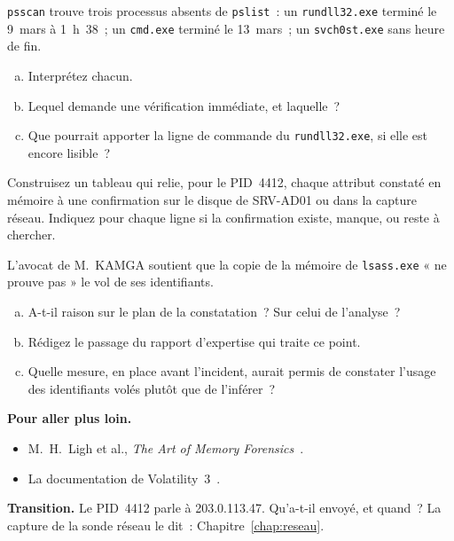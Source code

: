 \begin{boxexo}[title={\ding{45}\quad Exercice~5.2. pslist et psscan \niveaumoyen}]
\texttt{psscan} trouve trois processus absents de \texttt{pslist}~: un
\texttt{rundll32.exe} terminé le 9~mars à 1~h~38~; un \texttt{cmd.exe}
terminé le 13~mars~; un \texttt{svch0st.exe} sans heure de fin.
\begin{enumerate}[(a)]
    \item Interprétez chacun.
    \item Lequel demande une vérification immédiate, et laquelle~?
    \item Que pourrait apporter la ligne de commande du \texttt{rundll32.exe},
          si elle est encore lisible~?
\end{enumerate}
\end{boxexo}

\begin{boxexo}[title={\ding{45}\quad Exercice~5.3. Relier les sources \niveaumoyen}]
Construisez un tableau qui relie, pour le PID~4412, chaque attribut constaté
en mémoire à une confirmation sur le disque de SRV-AD01 ou dans la capture
réseau. Indiquez pour chaque ligne si la confirmation existe, manque, ou
reste à chercher.
\end{boxexo}

\begin{boxexo}[title={\ding{45}\quad Exercice~5.4. Ce qu'on ne peut pas montrer \niveauexpert}]
L'avocat de M.~KAMGA soutient que la copie de la mémoire de
\texttt{lsass.exe} « ne prouve pas » le vol de ses identifiants.
\begin{enumerate}[(a)]
    \item A-t-il raison sur le plan de la constatation~? Sur celui de
          l'analyse~?
    \item Rédigez le passage du rapport d'expertise qui traite ce point.
    \item Quelle mesure, en place avant l'incident, aurait permis de
          constater l'usage des identifiants volés plutôt que de l'inférer~?
\end{enumerate}
\end{boxexo}

\bigskip

\begin{boxinfo}
\textbf{Pour aller plus loin.}
\begin{itemize}
    \item M.~H.~Ligh et al., \textit{The Art of Memory
          Forensics}~\cite{ligh2014memory}.
    \item La documentation de Volatility~3~\cite{volatility3}.
\end{itemize}
\end{boxinfo}

\begin{boxinfo}
\textbf{Transition.} Le PID~4412 parle à 203.0.113.47. Qu'a-t-il envoyé, et
quand~? La capture de la sonde réseau le dit~: Chapitre~\ref{chap:reseau}.
\end{boxinfo}
